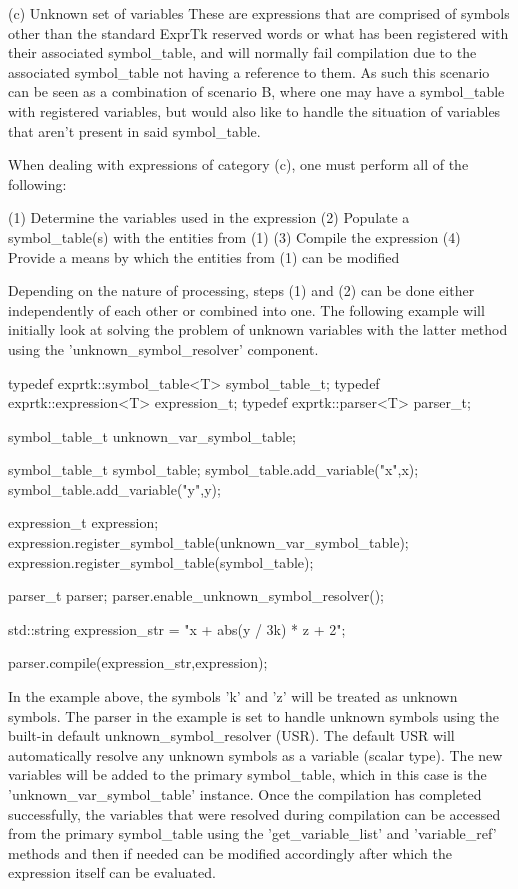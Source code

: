 (c) Unknown set of variables
These are  expressions that  are comprised  of symbols  other than the
standard ExprTk reserved words or what has been registered with  their
associated symbol\_table, and will normally fail compilation due to the
associated symbol\_table not having a  reference to them. As such  this
scenario can be  seen as a  combination of scenario  B, where one  may
have a symbol\_table with registered variables, but would also like  to
handle  the  situation  of  variables  that  aren't  present  in  said
symbol\_table.

When dealing with expressions of category (c), one must perform all of
the following:

(1) Determine the variables used in the expression
(2) Populate a symbol\_table(s) with the entities from (1)
(3) Compile the expression
(4) Provide a means by which the entities from (1) can be modified


Depending on the nature of processing,  steps (1) and (2) can be  done
either independently of each other or combined into one. The following
example  will  initially  look  at  solving  the  problem  of  unknown
variables with the  latter method using  the 'unknown\_symbol\_resolver'
component.

typedef exprtk::symbol\_table<T> symbol\_table\_t;
typedef exprtk::expression<T>     expression\_t;
typedef exprtk::parser<T>             parser\_t;

symbol\_table\_t unknown\_var\_symbol\_table;

symbol\_table\_t symbol\_table;
symbol\_table.add\_variable("x",x);
symbol\_table.add\_variable("y",y);

expression\_t expression;
expression.register\_symbol\_table(unknown\_var\_symbol\_table);
expression.register\_symbol\_table(symbol\_table);

parser\_t parser;
parser.enable\_unknown\_symbol\_resolver();

std::string expression\_str = "x + abs(y / 3k) * z + 2";

parser.compile(expression\_str,expression);


In the  example above,  the symbols  'k' and  'z' will  be treated  as
unknown symbols. The  parser in the  example is set  to handle unknown
symbols using the built-in default unknown\_symbol\_resolver (USR).  The
default  USR  will  automatically resolve  any  unknown  symbols as  a
variable (scalar type). The new variables will be added to the primary
symbol\_table,  which in  this case  is the  'unknown\_var\_symbol\_table'
instance.  Once  the  compilation  has  completed  successfully,   the
variables that were resolved  during compilation can be  accessed from
the   primary   symbol\_table   using   the   'get\_variable\_list'   and
'variable\_ref' methods and then if needed can be modified  accordingly
after which the expression itself can be evaluated.

